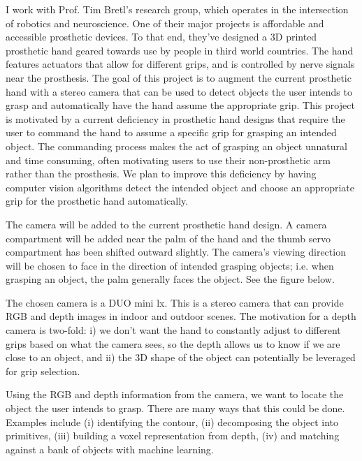 \documentclass[12pt]{article}
\begin{document}
I work with Prof. Tim Bretl’s research group, which operates in the intersection
of robotics and neuroscience. One of their major projects is affordable and
accessible prosthetic devices. To that end, they’ve designed a 3D printed
prosthetic hand geared towards use by people in third world countries. The hand
features actuators that allow for different grips, and is controlled by nerve
signals near the prosthesis. The goal of this project is to augment the current
prosthetic hand with a stereo camera that can be used to detect objects the user
intends to grasp and automatically have the hand assume the appropriate grip.
This project is motivated by a current deficiency in prosthetic hand designs
that require the user to command the hand to assume a specific grip for grasping
an intended object. The commanding process makes the act of grasping an object
unnatural and time consuming, often motivating users to use their non-prosthetic
arm rather than the prosthesis. We plan to improve this deficiency by having
computer vision algorithms detect the intended object and choose an appropriate
grip for the prosthetic hand automatically. \newline

The camera will be added to the current prosthetic hand design. A camera
compartment will be added near the palm of the hand and the thumb servo
compartment has been shifted outward slightly. The camera’s viewing direction
will be chosen to face in the direction of intended grasping objects; i.e. when
grasping an object, the palm generally faces the object. See the figure below.
\newline

The chosen camera is a DUO mini lx. This is a stereo camera that can provide RGB
and depth images in indoor and outdoor scenes. The motivation for a depth camera
is two-fold: i) we don’t want the hand to constantly adjust to different grips
based on what the camera sees, so the depth allows us to know if we are close to
an object, and ii) the 3D shape of the object can potentially be leveraged for
grip selection. \newline

Using the RGB and depth information from the camera, we want to
locate the object the user intends to grasp. There are many ways that this could
be done. Examples include (i) identifying the contour, (ii) decomposing the
object into primitives, (iii) building a voxel representation from depth, (iv)
and matching against a bank of objects with machine learning. \newline
\end{document}
